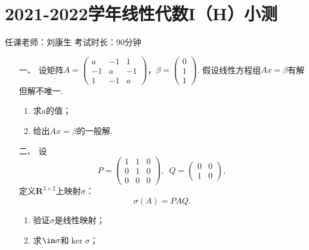 \section*{2021-2022学年线性代数I（H）小测}

\begin{center}
    任课老师：刘康生\hspace{4em} 考试时长：90分钟
\end{center}
\begin{enumerate}
	\item[一、] 设矩阵$A=\begin{pmatrix}
        a & -1 & 1 \\ -1 & a & -1 \\ 1 & -1 & a
    \end{pmatrix}$，$\beta=\begin{pmatrix}
        0 \\ 1 \\ 1
    \end{pmatrix}$. 假设线性方程组$Ax=\beta$有解但解不唯一.
    \begin{enumerate}[label=(\arabic*)]
        \item 求$a$的值；

        \item 给出$Ax=\beta$的一般解.
    \end{enumerate}
	\item[二、]设
	\[P=\begin{pmatrix}
        1 & 1 & 0 \\ 0 & 1 & 0 \\ 0 & 0 & 0
    \end{pmatrix},\enspace Q=\begin{pmatrix}
        0 & 0 \\ 1 & 0
    \end{pmatrix},\]
    定义$\mathbf{R}^{3\times 2}$上映射$\sigma$：
    \[\sigma(A)=PAQ.\]
    \begin{enumerate}[label=(\arabic*)]
        \item 验证$\sigma$是线性映射；

        \item 求$\im\sigma$和$\ker\sigma$；


\end{enumerate}
\end{enumerate}
